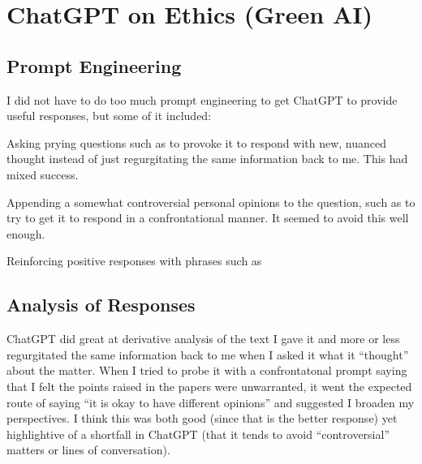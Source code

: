 \section{ChatGPT on Ethics (Green AI)}

\subsection{Prompt Engineering}

I did not have to do too much prompt engineering
to get ChatGPT to provide useful responses,
but some of it included:

\begin{enumarabic}
  \item Asking prying questions such as
    to provoke it to respond with new, nuanced thought
    instead of just regurgitating the same information back to me.
    This had mixed success.

  \item Appending a somewhat controversial personal opinions
    to the question, such as
    to try to get it to respond
    in a confrontational manner.
    It seemed to avoid this well enough.

  \item Reinforcing positive responses with phrases such as
    \emph{}
  
\end{enumarabic}

\subsection{Analysis of Responses}

ChatGPT did great at derivative analysis of the text I gave it
and more or less regurgitated the same information back to me
when I asked it what it ``thought'' about the matter.
When I tried to probe it with a confrontatonal prompt saying
that I felt the points raised in the papers were unwarranted,
it went the expected route of saying ``it is okay to have different
opinions'' and suggested I broaden my perspectives.
I think this was both good (since that is the better response)
yet highlightive of a shortfall in ChatGPT
(that it tends to avoid ``controversial'' matters
or lines of conversation).

